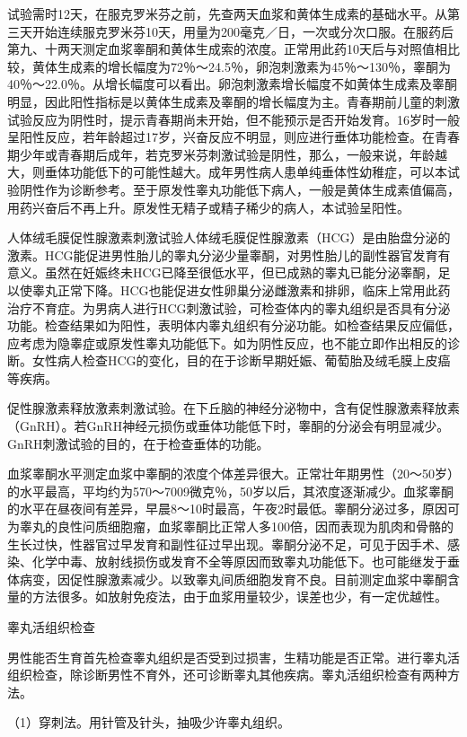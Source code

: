 \documentclass[12pt,UTF8]{ctexbook}
\begin{document}
试验需时12天，在服克罗米芬之前，先查两天血浆和黄体生成素的基础水平。从第三天开始连续服克罗米芬10天，用量为200毫克／日，一次或分次口服。在服药后第九、十两天测定血浆睾酮和黄体生成索的浓度。正常用此药10天后与对照值相比较，黄体生成素的增长幅度为72％～24.5％，卵泡刺激素为45％～130％，睾酮为40％～22.0％。从增长幅度可以看出。卵泡刺激素增长幅度不如黄体生成素及睾酮明显，因此阳性指标是以黄体生成素及睾酮的增长幅度为主。青春期前儿童的刺激试验反应为阴性时，提示青春期尚未开始，但不能预示是否开始发育。16岁时一般呈阳性反应，若年龄超过17岁，兴奋反应不明显，则应进行垂体功能检查。在青春期少年或青春期后成年，若克罗米芬刺激试验是阴性，那么，一般来说，年龄越大，则垂体功能低下的可能性越大。成年男性病人患单纯垂体性幼稚症，可以本试验阴性作为诊断参考。至于原发性睾丸功能低下病人，一般是黄体生成素值偏高，用药兴奋后不再上升。原发性无精子或精子稀少的病人，本试验呈阳性。

人体绒毛膜促性腺激素刺激试验人体绒毛膜促性腺激素（HCG）是由胎盘分泌的激素。HCG能促进男性胎儿的睾丸分泌少量睾酮，对男性胎儿的副性器官发育有意义。虽然在妊娠终未HCG已降至很低水平，但已成熟的睾丸已能分泌睾酮，足以使睾丸正常下降。HCG也能促进女性卵巢分泌雌激素和排卵，临床上常用此药治疗不育症。为男病人进行HCG刺激试验，可检查体内的睾丸组织是否具有分泌功能。检查结果如为阳性，表明体内睾丸组织有分泌功能。如检查结果反应偏低，应考虑为隐睾症或原发性睾丸功能低下。如为阴性反应，也不能立即作出相反的诊断。女性病人检查HCG的变化，目的在于诊断早期妊娠、葡萄胎及绒毛膜上皮癌等疾病。

促性腺激素释放激素刺激试验。在下丘脑的神经分泌物中，含有促性腺激素释放素（GnRH）。若GnRH神经元损伤或垂体功能低下时，睾酮的分泌会有明显减少。GnRH刺激试验的目的，在于检查垂体的功能。

血浆睾酮水平测定血浆中睾酮的浓度个体差异很大。正常壮年期男性（20～50岁）的水平最高，平均约为570～7009微克％，50岁以后，其浓度逐渐减少。血浆睾酮的水平在昼夜间有差异，早晨8～10时最高，午夜2时最低。睾酮分泌过多，原因可为睾丸的良性问质细胞瘤，血浆睾酮比正常人多100倍，因而表现为肌肉和骨骼的生长过快，性器官过早发育和副性征过早出现。睾酮分泌不足，可见于因手术、感染、化学中毒、放射线损伤或发育不全等原因而致睾丸功能低下。也可能继发于垂体病变，因促性腺激素减少。以致睾丸间质细胞发育不良。目前测定血浆中睾酮含量的方法很多。如放射免疫法，由于血浆用量较少，误差也少，有一定优越性。

睾丸活组织检查

男性能否生育首先检查睾丸组织是否受到过损害，生精功能是否正常。进行睾丸活组织检查，除诊断男性不育外，还可诊断睾丸其他疾病。睾丸活组织检查有两种方法。

（1）穿刺法。用针管及针头，抽吸少许睾丸组织。
\end{document}
